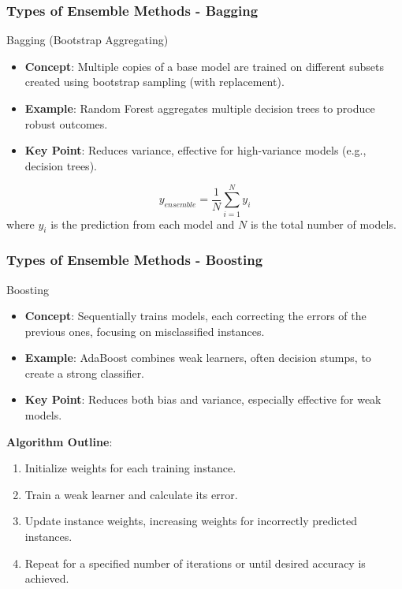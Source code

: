 \documentclass[aspectratio=169]{beamer}
\begin{document}
\begin{frame}[fragile]
    \frametitle{Types of Ensemble Methods - Bagging}
    \begin{block}{Bagging (Bootstrap Aggregating)}
        \begin{itemize}
            \item \textbf{Concept}: Multiple copies of a base model are trained on different subsets created using bootstrap sampling (with replacement).
            \item \textbf{Example}: Random Forest aggregates multiple decision trees to produce robust outcomes.
            \item \textbf{Key Point}: Reduces variance, effective for high-variance models (e.g., decision trees).
        \end{itemize}

        \begin{equation}
            y_{ensemble} = \frac{1}{N} \sum_{i=1}^{N} y_i
        \end{equation}
        where \( y_i \) is the prediction from each model and \( N \) is the total number of models.
    \end{block}
\end{frame}

\begin{frame}[fragile]
    \frametitle{Types of Ensemble Methods - Boosting}
    \begin{block}{Boosting}
        \begin{itemize}
            \item \textbf{Concept}: Sequentially trains models, each correcting the errors of the previous ones, focusing on misclassified instances.
            \item \textbf{Example}: AdaBoost combines weak learners, often decision stumps, to create a strong classifier.
            \item \textbf{Key Point}: Reduces both bias and variance, especially effective for weak models.
        \end{itemize}

        \textbf{Algorithm Outline}:
        \begin{enumerate}
            \item Initialize weights for each training instance.
            \item Train a weak learner and calculate its error.
            \item Update instance weights, increasing weights for incorrectly predicted instances.
            \item Repeat for a specified number of iterations or until desired accuracy is achieved.
        \end{enumerate}
    \end{block}
\end{frame}
\end{document}
